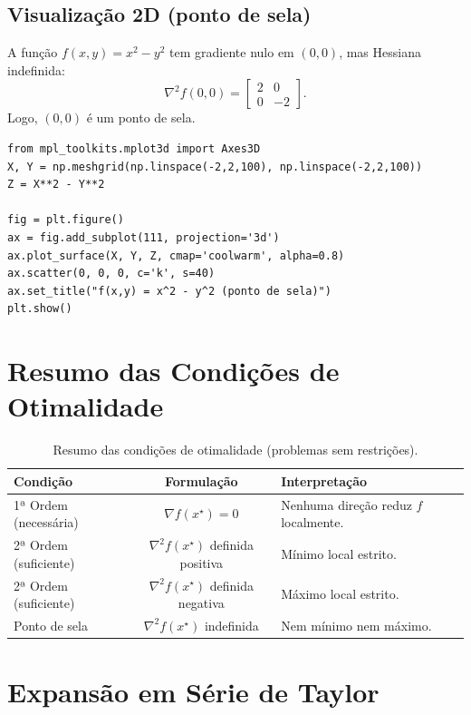 \documentclass[9pt,a4paper]{extarticle}
\begin{document}
\subsection*{Visualização 2D (ponto de sela)}
A função $f(x,y) = x^2 - y^2$ tem gradiente nulo em $(0,0)$, mas Hessiana indefinida:
\[
\nabla^2 f(0,0) =
\begin{bmatrix}
2 & 0 \\ 0 & -2
\end{bmatrix}.
\]
Logo, $(0,0)$ é um ponto de sela.

\begin{lstlisting}
from mpl_toolkits.mplot3d import Axes3D
X, Y = np.meshgrid(np.linspace(-2,2,100), np.linspace(-2,2,100))
Z = X**2 - Y**2

fig = plt.figure()
ax = fig.add_subplot(111, projection='3d')
ax.plot_surface(X, Y, Z, cmap='coolwarm', alpha=0.8)
ax.scatter(0, 0, 0, c='k', s=40)
ax.set_title("f(x,y) = x^2 - y^2 (ponto de sela)")
plt.show()
\end{lstlisting}

\pagebreak

\section{Resumo das Condições de Otimalidade}

\begin{table}[!ht]
\centering
\small
\setlength{\tabcolsep}{5pt}
\renewcommand{\arraystretch}{1.15}
\begin{tabular}{@{}lcl@{}}
\toprule
\textbf{Condição} & \textbf{Formulação} & \textbf{Interpretação} \\
\midrule
1ª Ordem (necessária) & $\nabla f(x^\star) = 0$ & Nenhuma direção reduz $f$ localmente. \\
2ª Ordem (suficiente) & $\nabla^2 f(x^\star)$ definida positiva & Mínimo local estrito. \\
2ª Ordem (suficiente) & $\nabla^2 f(x^\star)$ definida negativa & Máximo local estrito. \\
Ponto de sela & $\nabla^2 f(x^\star)$ indefinida & Nem mínimo nem máximo. \\
\bottomrule
\end{tabular}
\caption{Resumo das condições de otimalidade (problemas sem restrições).}
\end{table}


\section{Expansão em Série de Taylor}
\end{document}
